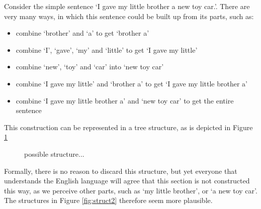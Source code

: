 \documentclass{report}
\theoremstyle{definition}
\theoremstyle{plain}
\begin{document}
Consider the simple sentence `I gave my little brother a new toy car.'. There are very many ways, in which this sentence could be built up from its parts, such as:\begin{itemize}
\item combine `brother' and `a' to get `brother a'
\item combine `I', `gave', `my' and `little' to get `I gave my little'
\item combine `new', `toy' and `car' into `new toy car'
\item combine `I gave my little' and `brother a' to get `I gave my little brother a'
\item combine `I gave my little brother a' and `new toy car' to get the entire sentence
\end{itemize}

This construction can be represented in a tree structure, as is depicted in Figure \ref{fig:struct1}

\begin{figure}[!ht]
\centering
{}
\caption{possible structure...}\label{fig:struct1}
\end{figure}

Formally, there is no reason to discard this structure, but yet everyone that understands the English language will agree that this section is not constructed this way, as we perceive other parts, such as `my little brother', or `a new toy car'. The structures in Figure \ref{fig:struct2} therefore seem more plausible.
\end{document}
